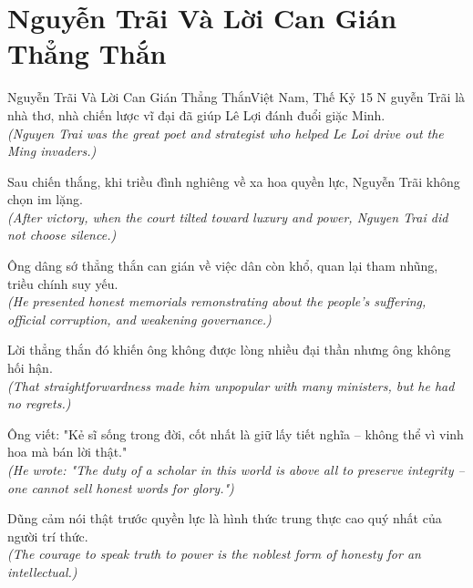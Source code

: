 \section{Nguyễn Trãi Và Lời Can Gián Thẳng Thắn}
\begin{truyen}{Nguyễn Trãi Và Lời Can Gián Thẳng Thắn}{Việt Nam, Thế Kỷ 15}
N guyễn Trãi là nhà thơ, nhà chiến lược vĩ đại đã giúp Lê Lợi đánh đuổi giặc Minh.\\
\textit{(Nguyen Trai was the great poet and strategist who helped Le Loi drive out the Ming invaders.)}

Sau chiến thắng, khi triều đình nghiêng về xa hoa quyền lực, Nguyễn Trãi không chọn im lặng.\\
\textit{(After victory, when the court tilted toward luxury and power, Nguyen Trai did not choose silence.)}

Ông dâng sớ thẳng thắn can gián về việc dân còn khổ, quan lại tham nhũng, triều chính suy yếu.\\
\textit{(He presented honest memorials remonstrating about the people's suffering, official corruption, and weakening governance.)}

Lời thẳng thắn đó khiến ông không được lòng nhiều đại thần nhưng ông không hối hận.\\
\textit{(That straightforwardness made him unpopular with many ministers, but he had no regrets.)}

Ông viết: "Kẻ sĩ sống trong đời, cốt nhất là giữ lấy tiết nghĩa -- không thể vì vinh hoa mà bán lời thật."\\
\textit{(He wrote: "The duty of a scholar in this world is above all to preserve integrity -- one cannot sell honest words for glory.")}

\end{truyen}
\begin{baihoc}
  Dũng cảm nói thật trước quyền lực là hình thức trung thực cao quý nhất của người trí thức.\\
  \textit{(The courage to speak truth to power is the noblest form of honesty for an intellectual.)}
\end{baihoc}
